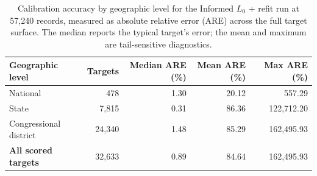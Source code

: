 \begin{table}[H]
\centering
{\tablefont
\begin{tabular}{lrrrr}
\toprule
Geographic level & Targets & Median ARE (\%) & Mean ARE (\%) & Max ARE (\%) \\
\midrule
National & 478 & 1.30 & 20.12 & 557.29 \\
State & 7{,}815 & 0.31 & 86.36 & 122{,}712.20 \\
Congressional district & 24{,}340 & 1.48 & 85.29 & 162{,}495.93 \\
\midrule
\textbf{All scored targets} & 32{,}633 & 0.89 & 84.64 & 162{,}495.93 \\
\bottomrule
\end{tabular}
}
\caption{Calibration accuracy by geographic level for the Informed $L_0$ + refit run at 57{,}240
records, measured as absolute relative error (ARE) across the full target surface. The median reports the
typical target's error; the mean and maximum are tail-sensitive diagnostics.}
\label{sp:tab:calibration_accuracy}
\end{table}
